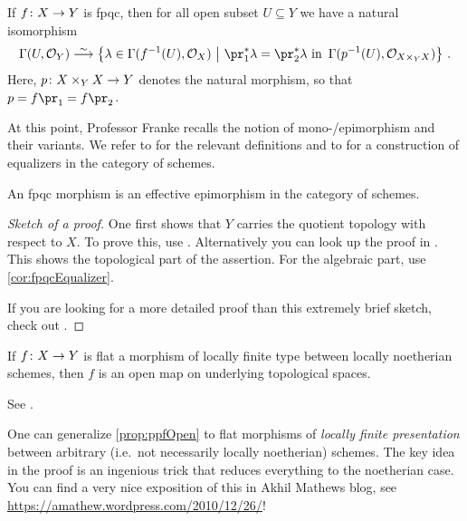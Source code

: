 \begin{cor}\label{cor:fpqcEqualizer}
	If $f\colon X\morphism Y$ is fpqc, then for all open subset $U\subseteq Y$ we have a natural isomorphism
	\begin{equation*}
		\Global(U,\Oo_Y)\isomorphism\left\{\lambda\in \Global(f^{-1}(U),\Oo_X)\st \pr_1^*\lambda =\pr_2^*\lambda\text{ in }\Global(p^{-1}(U),\Oo_{X\times_YX})\right\}\,.
	\end{equation*}
	Here, $p\colon X\times_YX\morphism Y$ denotes the natural morphism, so that $p=f\pr_1=f\pr_2$.
\end{cor}
At this point, Professor Franke recalls the notion of mono-/epimorphism and their  variants. We refer to \cite[Appendix~A.1]{alggeo2} for the relevant definitions and to \cite[Subsection~1.3.1]{alggeo1} for a construction of equalizers in the category of schemes.
\begin{prop}\label{prop:fpqcEffectiveEpi}
	An fpqc morphism is an effective epimorphism in the category of schemes.
\end{prop}
\begin{proof}[Sketch of a proof]
	One first shows that $Y$ carries the quotient topology with respect to $X$. To prove this, use \cite[Exposé~VIII Théorème~4.1]{sga1}. Alternatively you can look up the proof in \cite[Proposition~2.5.3]{jacobians}. This shows the topological part of the assertion. For the algebraic part, use \cref{cor:fpqcEqualizer}.
	
	If you are looking for a more detailed proof than this extremely brief sketch, check out \cite[Corollary~2.6.2]{jacobians}.
\end{proof}
\begin{prop}\label{prop:ppfOpen}
	If $f\colon X\morphism Y$ is flat a morphism of locally finite type between locally noetherian schemes, then $f$ is an open map on underlying topological spaces.
\end{prop}
\begin{proof*}
	See \cite[Corollary~2.5.1]{jacobians}.
\end{proof*}
\begin{rem*}\label{rem*:nonNoetherianBaseChange}
	One can generalize \cref{prop:ppfOpen} to flat morphisms of \emph{locally finite presentation} between arbitrary (i.e.\ not necessarily locally noetherian) schemes. The key idea in the proof is an ingenious trick that reduces
	everything to the noetherian case. You can find a very nice exposition of this in Akhil Mathews
	blog, see \url{https://amathew.wordpress.com/2010/12/26/}!
\end{rem*}

